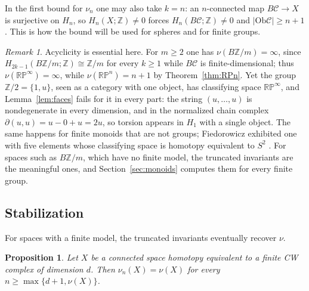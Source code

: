\documentclass[12pt]{amsart}
\newtheorem{proposition}[teo]{Proposition}
\theoremstyle{definition}
\theoremstyle{remark}
\newtheorem{remark}[teo]{Remark}
\newcommand{\CC}{\mathcal{C}}
\newcommand{\Ob}{\mathrm{Ob}}
\newcommand{\Z}{\mathbb{Z}}
\newcommand{\RP}{\mathbb{RP}}
\begin{document}
In the first bound for $\nu_n$ one may also take $k=n$: an $n$-connected map $B\CC\to X$ is surjective on $H_n$, so $H_n(X;\Z)\neq0$ forces $H_n(B\CC;\Z)\neq0$ and $|\Ob\CC|\ge n+1$. This is how the bound will be used for spheres and for finite groups.

\begin{remark}\label{rem:BG}
Acyclicity is essential here. For $m\ge2$ one has $\nu(B\Z/m)=\infty$, since $H_{2k-1}(B\Z/m;\Z)\cong\Z/m$ for every $k\ge1$ \cite{Hatcher2002} while $B\CC$ is finite-dimensional; thus $\nu(\RP^\infty)=\infty$, while $\nu(\RP^n)=n+1$ by Theorem~\ref{thm:RPn}. Yet the group $\Z/2=\{1,u\}$, seen as a category with one object, has classifying space $\RP^\infty$, and Lemma~\ref{lem:faces} fails for it in every part: the string $(u,\dots,u)$ is nondegenerate in every dimension, and in the normalized chain complex $\partial(u,u)=u-0+u=2u$, so torsion appears in $H_1$ with a single object. The same happens for finite monoids that are not groups; Fiedorowicz exhibited one with five elements whose classifying space is homotopy equivalent to $S^2$ \cite{Fiedorowicz2002}. For spaces such as $B\Z/m$, which have no finite model, the truncated invariants are the meaningful ones, and Section~\ref{sec:monoids} computes them for every finite group.
\end{remark}

\subsection{Stabilization}\label{subsec:stabilization}

For spaces with a finite model, the truncated invariants eventually recover $\nu$.

\begin{proposition}\label{lem:nu-n}\label{prop:stabilization}
Let $X$ be a connected space homotopy equivalent to a finite CW complex of dimension $d$. Then $\nu_n(X)=\nu(X)$ for every $n\ge\max\{d+1,\nu(X)\}$.
\end{proposition}
\end{document}
